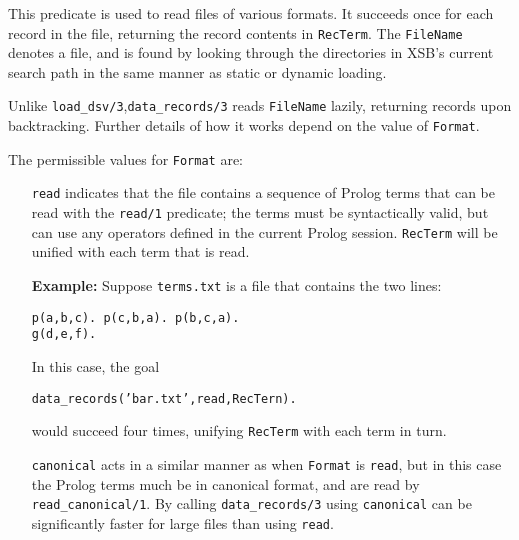 \begin{description}
This predicate is used to read files of various formats.  It succeeds
once for each record in the file, returning the record contents in
{\tt RecTerm}.  The {\tt FileName} denotes a file, and is found by
looking through the directories in XSB's current search path in the
same manner as static or dynamic loading.

Unlike {\tt load\_dsv/3},{\tt data\_records/3} reads {\tt FileName}
lazily, returning records upon backtracking.  Further details of how
it works depend on the value of {\tt Format}.

The permissible values for {\tt Format} are:
\begin{itemize}

\item[{\tt read}] indicates that the file contains a sequence of
  Prolog terms that can be read with the {\tt read/1} predicate; the
  terms must be syntactically valid, but can use any operators defined
  in the current Prolog session.  {\tt RecTerm} will be unified with
  each term that is read.

  {\bf Example:} Suppose {\tt terms.txt} is a file that contains the
  two lines:
\begin{verbatim}
p(a,b,c). p(c,b,a). p(b,c,a).
g(d,e,f).
\end{verbatim}
In this case, the goal

{\tt data\_records('bar.txt',read,RecTern).}

\noindent
would succeed four times, unifying {\tt RecTerm} with each term in
turn.

\item[{\tt canonical}] acts in a similar manner as when {\tt Format}
  is {\tt read}, but in this case the Prolog terms much be in
  canonical format, and are read by {\tt read\_canonical/1}.  By
  calling {\tt data\_records/3} using {\tt canonical} can be
  significantly faster for large files than using {\tt read}.



\end{itemize}
\end{description}
